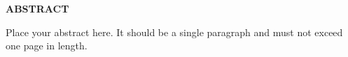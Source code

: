 \singlespacing
\begin{center}
    \MakeUppercase{\textbf{Abstract}}
 
    \end{center}  
Place your abstract here. It should be a single paragraph and must not exceed one page in length.
    
    
    
    
    
    
    
    
    
    

